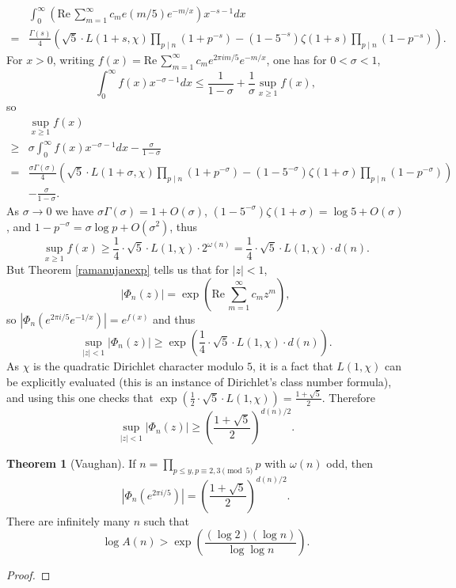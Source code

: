 \documentclass{article}
\def\Re{\ensuremath{\mathrm{Re}}\,}
\theoremstyle{definition}
\newtheorem{theorem}{Theorem}
\theoremstyle{definition}
\begin{document}
\[
\begin{split}
&\int_0^\infty \left( \Re \sum_{m=1}^\infty c_m e(m/5) e^{-m/x} \right) x^{-s-1} dx\\
=&\frac{\Gamma(s)}{4} \left( \sqrt{5} \cdot L(1+s,\chi)  \prod_{p \mid n} (1+p^{-s})
-(1- 5^{-s}) \zeta(1+s)   \prod_{p \mid n} (1-p^{-s}) \right).
\end{split}
\]
For $x>0$, writing $f(x) = \Re \sum_{m=1}^\infty c_m e^{2\pi im/5} e^{-m/x}$,
one has for $0<\sigma<1$,
\[
\int_0^\infty f(x) x^{-\sigma-1} dx \leq \frac{1}{1-\sigma} +  \frac{1}{\sigma} \sup_{x \geq 1} f(x),
\]
so
\[
\begin{split}
&\sup_{x \geq 1} f(x)\\
\geq &\sigma \int_0^\infty f(x) x^{-\sigma-1} dx - \frac{\sigma}{1-\sigma}\\
=&\frac{\sigma\Gamma(\sigma)}{4} \left( \sqrt{5} \cdot L(1+\sigma,\chi)  \prod_{p \mid n} (1+p^{-\sigma})
-(1- 5^{-\sigma}) \zeta(1+\sigma)   \prod_{p \mid n} (1-p^{-\sigma}) \right)\\
& - \frac{\sigma}{1-\sigma}.
\end{split}
\]
As $\sigma \to 0$ we have $\sigma \Gamma(\sigma) = 1+O(\sigma)$, $(1-5^{-\sigma})\zeta(1+\sigma) = \log 5 + O(\sigma)$, and
$1-p^{-\sigma} = \sigma \log p+O(\sigma^2)$, thus
\[
\sup_{x \geq 1} f(x) \geq \frac{1}{4} \cdot \sqrt{5} \cdot L(1,\chi) \cdot 2^{\omega(n)}= \frac{1}{4} \cdot \sqrt{5} \cdot L(1,\chi) \cdot d(n).
\]
But  Theorem \ref{ramanujanexp} tells us that for $|z|<1$,
\[
|\Phi_n(z)| = \exp\left( \Re \sum_{m=1}^\infty c_m z^m\right),
\]
so $|\Phi_n(e^{2\pi i/5} e^{-1/x})| = e^{f(x)}$ and thus
\[
\sup_{|z|<1} |\Phi_n(z)| \geq \exp\left( \frac{1}{4} \cdot \sqrt{5} \cdot L(1,\chi) \cdot d(n) \right).
\]
As $\chi$ is the quadratic Dirichlet character modulo $5$, it is a fact that
$L(1,\chi)$ can be explicitly evaluated (this is an instance of Dirichlet's class number formula),
and using this one checks
that $\exp\left( \frac{1}{2} \cdot \sqrt{5} \cdot L(1,\chi)\right) = \frac{1+\sqrt{5}}{2}$.
Therefore
\[
\sup_{|z|<1} |\Phi_n(z)| \geq \left( \frac{1+\sqrt{5}}{2}\right)^{d(n)/2}.
\]


\begin{theorem}[Vaughan]
If $n=\prod_{p \leq y, p \equiv 2,3 \pmod{5}} p$ with $\omega(n)$  odd, then
\[
|\Phi_n(e^{2\pi i/5})| = \left( \frac{1+\sqrt{5}}{2} \right)^{d(n)/2}.
\]
There are infinitely many $n$ such that 
\[
\log A(n) > \exp\left( \frac{(\log 2)(\log n)}{\log \log n}\right).
\]
\end{theorem}
\begin{proof}


\end{proof}
\end{document}
